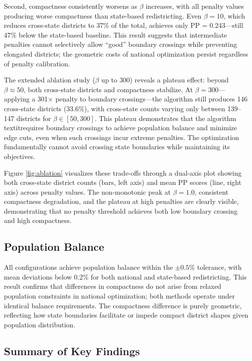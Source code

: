 Second, compactness consistently worsens as $ \beta $ increases, with all penalty values producing worse compactness than state-based redistricting. Even $ \beta = 10 $, which reduces cross-state districts to 37\% of the total, achieves only PP = 0.243---still 47\% below the state-based baseline. This result suggests that intermediate penalties cannot selectively allow ``good'' boundary crossings while preventing elongated districts; the geometric costs of national optimization persist regardless of penalty calibration.

The extended ablation study ($ \beta $ up to 300) reveals a plateau effect: beyond $ \beta \approx 50 $, both cross-state districts and compactness stabilize. At $ \beta = 300 $---applying a 301$\times$ penalty to boundary crossings---the algorithm still produces 146 cross-state districts (33.6\%), with cross-state counts varying only between 139--147 districts for $ \beta \in [50, 300] $. This plateau demonstrates that the algorithm \\textit{requires} boundary crossings to achieve population balance and minimize edge cuts, even when such crossings incur extreme penalties. The optimization fundamentally cannot avoid crossing state boundaries while maintaining its objectives.

Figure \ref{fig:ablation} visualizes these trade-offs through a dual-axis plot showing both cross-state district counts (bars, left axis) and mean PP scores (line, right axis) across penalty values. The non-monotonic peak at $ \beta = 1.0 $, consistent compactness degradation, and the plateau at high penalties are clearly visible, demonstrating that no penalty threshold achieves both low boundary crossing and high compactness.

\subsection{Population Balance}

All configurations achieve population balance within the $ \pm 0.5\% $ tolerance, with mean deviations below 0.2\% for both national and state-based redistricting. This result confirms that differences in compactness do not arise from relaxed population constraints in national optimization; both methods operate under identical balance requirements. The compactness difference is purely geometric, reflecting how state boundaries facilitate or impede compact district shapes given population distribution.

\subsection{Summary of Key Findings}

